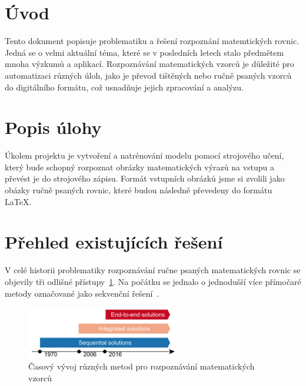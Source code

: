 \section{Úvod}
Tento dokument popisuje problematiku a řešení rozpoznání matemtických rovnic. Jedná se o velmi aktuální téma, které se v posledních letech stalo předmětem mnoha výzkumů a aplikací. Rozpoznávání matematických vzorců je důležité pro automatizaci různých úloh, jako je převod tištěných nebo ručně psaných vzorců do digitálního formátu, což usnadňuje jejich zpracování a analýzu.


\section{Popis úlohy}
Úkolem projektu je vytvoření a natrénování modelu pomocí strojového učení, který bude schopný rozpoznat obrázky matematických výrazů na vstupu a převést je do strojového zápisu. Formát vstupních obrázků jsme si zvolili jako obázky ručně psaných rovnic, které budou následně převedeny do formátu LaTeX.  


\section{Přehled existujících řešení}
V celé historii problematiky rozpoznávání ručne psaných matematických rovnic se objevily tři odlišné přístupy~\ref{img:method_history}. Na počátku se jednalo o jednodušší více přímočaré metody označované jako sekvenční řešení~\cite{ukr_survey}.

\begin{figure}[h!]
    \centering
    \includegraphics[width=0.6\textwidth]{img/method_history.png}
    \caption{Časový vývoj různých metod pro rozpoznávání matematických vzorců}
    \label{img:method_history}
\end{figure}

